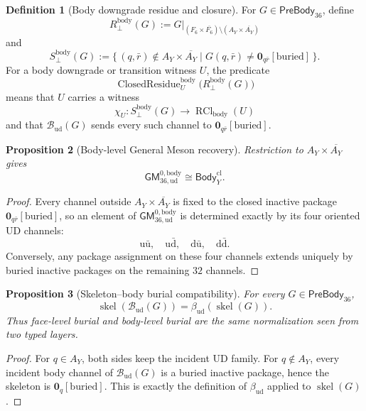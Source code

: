 \documentclass[11pt]{article}
\theoremstyle{definition}
\newtheorem{definition}{Definition}
\theoremstyle{plain}
\newtheorem{proposition}[definition]{Proposition}
\DeclareMathOperator{\ClosedResidue}{ClosedResidue}
\DeclareMathOperator{\RCl}{RCl}
\DeclareMathOperator{\skel}{skel}
\newcommand{\qu}{\mathrm u}
\newcommand{\qd}{\mathrm d}
\begin{document}
\begin{definition}[Body downgrade residue and closure]
For \(G\in\mathsf{PreBody}_{36}\), define
\[
  R^{\mathrm{body}}_{\perp}(G)
  :=
  G|_{(F_6\times\overline{F_6})\setminus
  (A_Y\times\overline{A_Y})}
\]
and
\[
  S^{\mathrm{body}}_{\perp}(G)
  :=
  \{\,(q,\bar r)\notin A_Y\times\overline{A_Y}\mid
  G(q,\bar r)\ne\mathbf 0_{q\bar r}[\mathrm{buried}]\,\}.
\]
For a body downgrade or transition witness \(U\), the predicate
\[
  \ClosedResidue^{\mathrm{body}}_{U}
  \bigl(R^{\mathrm{body}}_{\perp}(G)\bigr)
\]
means that \(U\) carries a witness
\[
  \chi_U:S^{\mathrm{body}}_{\perp}(G)\longrightarrow
  \RCl_{\mathrm{body}}(U)
\]
and that \(\mathcal B_{\qu\qd}(G)\) sends every such channel to
\(\mathbf 0_{q\bar r}[\mathrm{buried}]\).
\end{definition}

\begin{proposition}[Body-level General Meson recovery]
Restriction to
\(A_Y\times\overline{A_Y}\) gives
\[
  \mathsf{GM}_{36,\qu\qd}^{0,\mathrm{body}}
  \cong
  \mathsf{Body}_{Y}^{\mathrm{cl}}.
\]
\end{proposition}

\begin{proof}
Every channel outside \(A_Y\times\overline{A_Y}\) is fixed to the closed
inactive package \(\mathbf 0_{q\bar r}[\mathrm{buried}]\), so an element of
\(\mathsf{GM}_{36,\qu\qd}^{0,\mathrm{body}}\) is determined exactly by its
four oriented
UD channels:
\[
  \qu\bar{\qu},\quad
  \qu\bar{\qd},\quad
  \qd\bar{\qu},\quad
  \qd\bar{\qd}.
\]
Conversely, any package assignment on these four channels extends uniquely
by buried inactive packages on the remaining \(32\) channels.
\end{proof}

\begin{proposition}[Skeleton--body burial compatibility]
For every \(G\in\mathsf{PreBody}_{36}\),
\[
  \skel(\mathcal B_{\qu\qd}(G))
  =
  \beta_{\qu\qd}(\skel(G)).
\]
Thus face-level burial and body-level burial are the same normalization
seen from two typed layers.
\end{proposition}

\begin{proof}
For \(q\in A_Y\), both sides keep the incident UD family.  For
\(q\notin A_Y\), every incident body channel of
\(\mathcal B_{\qu\qd}(G)\) is a buried inactive package, hence the
skeleton is \(\mathbf 0_q[\mathrm{buried}]\).  This is exactly the
definition of \(\beta_{\qu\qd}\) applied to \(\skel(G)\).
\end{proof}
\end{document}
